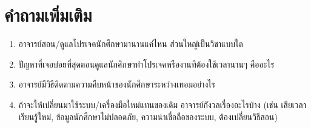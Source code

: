 \section{คำถามเพิ่มเติม}
\begin{enumerate}
  \item อาจารย์สอน/ดูแลโปรเจคนักศึกษามานานแค่ไหน ส่วนใหญ่เป็นวิชาแบบใด
  \item ปัญหาที่เจอบ่อยที่สุดตอนดูแลนักศึกษาทำโปรเจคหรืองานทีต้องใช้เวลานานๆ คืออะไร
  \item อาจารย์มีวิธีติดตามความคืบหน้าของนักศึกษาระหว่างเทอมอย่างไร
  \item ถ้าจะให้เปลี่ยนมาใช้ระบบ/เครื่องมือใหม่แทนของเดิม อาจารย์กังวลเรื่องอะไรบ้าง (เช่น เสียเวลาเรียนรู้ใหม่, ข้อมูลนักศึกษาไม่ปลอดภัย, ความน่าเชื่อถือของระบบ, ต้องเปลี่ยนวิธีสอน)
\end{enumerate}
